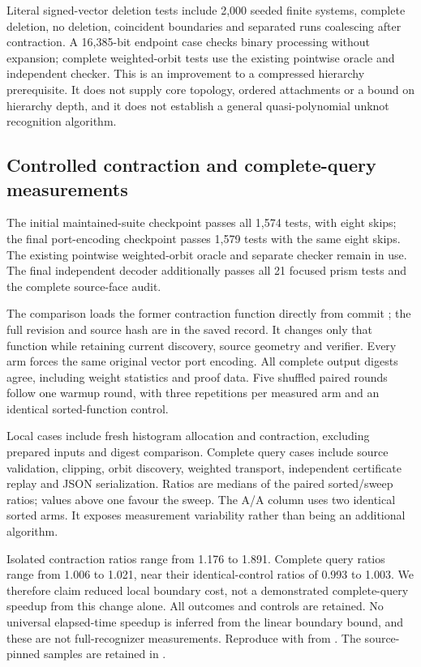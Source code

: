Literal signed-vector deletion tests include 2,000 seeded finite systems,
complete deletion, no deletion, coincident boundaries and separated runs
coalescing after contraction. A 16,385-bit endpoint case checks binary
processing without expansion; complete weighted-orbit tests use the existing
pointwise oracle and independent checker. This is an improvement to a
compressed hierarchy prerequisite. It does not supply core topology,
ordered attachments or a bound on hierarchy depth, and it does not establish
a general quasi-polynomial unknot recognition algorithm.

\subsection{Controlled contraction and complete-query measurements}

The initial maintained-suite checkpoint passes all 1,574 tests, with eight
skips; the final port-encoding checkpoint passes 1,579 tests with the same
eight skips. The existing pointwise weighted-orbit oracle and separate
checker remain in use. The final independent decoder additionally passes
all 21 focused prism tests and the complete source-face audit.

The comparison loads the former contraction function directly from commit
; the full revision and source hash are in the saved record.
It changes only that function while retaining current discovery, source
geometry and verifier.
Every arm forces the same original vector port encoding. All complete
output digests agree, including weight statistics and proof data.
Five shuffled paired rounds follow one warmup round, with three repetitions
per measured arm and an identical sorted-function control.

Local cases include fresh histogram allocation and contraction, excluding
prepared inputs and digest comparison. Complete query cases include source
validation, clipping, orbit discovery, weighted transport, independent
certificate replay and JSON serialization. Ratios are medians of the paired
sorted/sweep ratios; values above one favour the sweep. The A/A column uses
two identical sorted arms. It exposes measurement variability rather than
being an additional algorithm.


Isolated contraction ratios range from 1.176 to 1.891. Complete query ratios
range from 1.006 to 1.021, near their identical-control ratios of 0.993 to
1.003. We therefore claim reduced local boundary cost, not a demonstrated
complete-query speedup from this change alone. All outcomes and controls are
retained. No universal elapsed-time speedup is inferred from the linear
boundary bound, and these are not full-recognizer measurements. Reproduce with
 from .
The source-pinned samples are retained in
.
